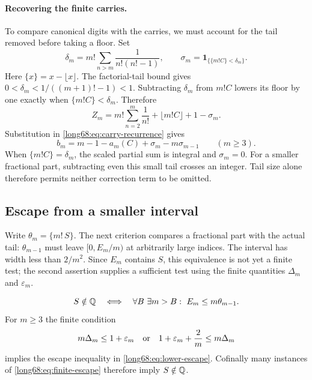 \documentclass[11pt]{article}
\newcommand{\Ser}{S}
\begin{document}
\paragraph{Recovering the finite carries.}\label{long68:sec:floor-correction}
To compare canonical digits with the carries, we must account for the
tail removed before taking a floor. Set
\[
 \delta_m=m!\sum_{n>m}\frac1{n!(n!-1)},\qquad
 \sigma_m=\mathbf1_{\{\{m!C\}<\delta_m\}}.
\]
Here $\{x\}=x-\lfloor x\rfloor$. The factorial-tail bound gives
$0<\delta_m<1/((m+1)!-1)<1$. Subtracting $\delta_m$ from $m!C$
lowers its floor by one exactly when $\{m!C\}<\delta_m$. Therefore
\[
 Z_m=m!\sum_{n=2}^m\frac1{n!}+\lfloor m!C\rfloor+1-\sigma_m.
\]
Substitution in \eqref{long68:eq:carry-recurrence} gives
\begin{equation}
 b_m=m-1-a_m(C)+\sigma_m-m\sigma_{m-1}\qquad(m\ge3).
 \label{long68:eq:companion-wrap}
\end{equation}
When $\{m!C\}=\delta_m$, the scaled partial sum is integral and $\sigma_m=0$.
For a smaller fractional part, subtracting even this small tail crosses
an integer. Tail size alone therefore permits neither correction term
to be omitted.

\subsection{Escape from a smaller interval}

Write $\theta_m=\{m!\,\Ser\}$. The next criterion compares a
fractional part with the actual tail: $\theta_{m-1}$ must leave
$[0,E_m/m)$ at arbitrarily large indices. The interval has width
less than $2/m^2$. Since $E_m$ contains $S$, this equivalence is not
yet a finite test; the second assertion supplies a sufficient test
using the finite quantities $\Delta_m$ and $\varepsilon_m$.

\begin{proposition}\label{long68:res:lower-escape}
\begin{equation}\label{long68:eq:lower-escape}
 \Ser\notin\Q
 \quad\Longleftrightarrow\quad
 \forall B\ \exists m>B:\ E_m\le m\theta_{m-1}.
\end{equation}
For $m\ge3$ the finite condition
\begin{equation}\label{long68:eq:finite-escape}
 m\Delta_m\le1+\varepsilon_m
 \quad\hbox{or}\quad
 1+\varepsilon_m+\frac2m\le m\Delta_m
\end{equation}
implies the escape inequality in \eqref{long68:eq:lower-escape}.  Cofinally many
instances of \eqref{long68:eq:finite-escape} therefore imply $\Ser\notin\Q$.
\end{proposition}
\end{document}

